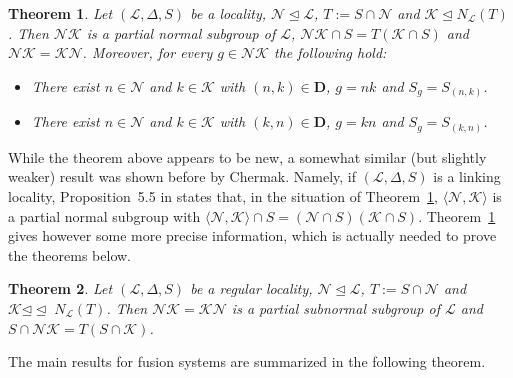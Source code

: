 \documentclass[reqno,11pt]{amsart}
\numberwithin{equation}{section}
\newtheorem{Th}{Theorem}
\theoremstyle{definition}
\renewcommand{\L}{\mathcal{L}}
\newcommand{\N}{\mathcal{N}}
\newcommand{\K}{\mathcal{K}}
\newcommand{\D}{\mathbf{D}}
\def \<{\langle }
\def \>{\rangle }
\newcommand{\subn}{{\unlhd\!\unlhd\;}}
\begin{document}
\begin{Th}\label{P:Localities}
Let $(\L,\Delta,S)$ be a locality, $\N\unlhd\L$, $T:=S\cap\N$ and $\K\unlhd N_\L(T)$. Then $\N\K$ is a partial normal subgroup of $\L$, $\N\K\cap S=T(\K\cap S)$ and $\N\K=\K\N$. Moreover, for every $g\in\N\K$ the following hold:
\begin{itemize}
\item [(a)] There exist $n\in\N$ and $k\in\K$ with $(n,k)\in\D$, $g=nk$ and $S_g=S_{(n,k)}$.
\item [(b)] There exist $n\in\N$ and $k\in\K$ with $(k,n)\in\D$, $g=kn$ and $S_g=S_{(k,n)}$.
\end{itemize}
\end{Th}


While the theorem above appears to be new, a somewhat similar (but slightly weaker) result was shown before by Chermak. Namely, if $(\L,\Delta,S)$ is a linking locality, Proposition~5.5 in \cite{Chermak:2015} states that, in the situation of Theorem~\ref{P:Localities}, $\<\N,\K\>$ is a partial normal subgroup with $\<\N,\K\>\cap S=(\N\cap S)(\K\cap S)$. Theorem~\ref{P:Localities} gives however some more precise information, which is actually needed to prove the theorems below.

\begin{Th}\label{C:NK}
Let $(\L,\Delta,S)$ be a regular locality, $\N\unlhd \L$, $T:=S\cap\N$ and $\K\subn N_\L(T)$. Then $\N\K=\K\N$ is a partial subnormal subgroup of $\L$ and $S\cap\N\K=T(S\cap \K)$.
\end{Th}

The main results for fusion systems are summarized in the following theorem.
\end{document}
